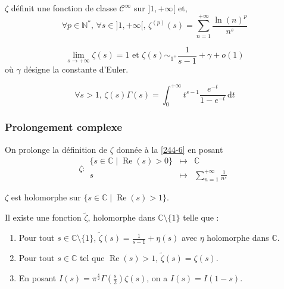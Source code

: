 	\begin{proposition}
		$\zeta$ définit une fonction de classe $\mathcal{C}^\infty$ sur $]1, +\infty[$ et,
		\[ \forall p \in \mathbb{N}^*, \, \forall s \in ]1, +\infty[, \, \zeta^{(p)}(s) = \sum_{n=1}^{+\infty} \frac{\ln(n)^p}{n^s} \]
	\end{proposition}
	
	\begin{proposition}
		\[ \lim_{s \rightarrow +\infty} \zeta(s) = 1 \text{ et } \zeta(s) \sim_{1^+} \frac{1}{s-1} + \gamma + o(1) \]
		où $\gamma$ désigne la constante d'Euler.
	\end{proposition}
	
	
	\begin{proposition}
		\[ \forall s > 1, \, \zeta(s) \Gamma(s) = \int_0^{+\infty} t^{s-1} \frac{e^{-t}}{1 - e^{-t}} \, \mathrm{d}t \]
	\end{proposition}
	
	\subsubsection{Prolongement complexe}
	
	
	\begin{proposition}
		On prolonge la définition de $\zeta$ donnée à la \cref{244-6} en posant
		\[
			\zeta :
			\begin{array}{ccc}
				\{ s \in \mathbb{C} \mid \operatorname{Re}(s) > 0 \} &\mapsto& \mathbb{C} \\
				s &\mapsto& \sum_{n=1}^{+\infty} \frac{1}{n^s}
			\end{array}
		\]
	\end{proposition}
	
	\begin{proposition}
		$\zeta$ est holomorphe sur $\{ s \in \mathbb{C} \mid \operatorname{Re}(s) > 1 \}$.
	\end{proposition}
	
	
	\begin{theorem}
		Il existe une fonction $\widetilde{\zeta}$, holomorphe dans $\mathbb{C} \setminus \{ 1 \}$ telle que :
		\begin{enumerate}[label=(\roman*)]
			\item Pour tout $s \in \mathbb{C} \setminus \{ 1 \}$, $\widetilde{\zeta}(s) = \frac{1}{s-1} + \eta(s)$ avec $\eta$ holomorphe dans $\mathbb{C}$.
			\item Pour tout $s \in \mathbb{C}$ tel que $\operatorname{Re}(s) > 1$, $\widetilde{\zeta}(s) = \zeta(s)$.
			\item En posant $I(s) = \pi^{\frac{s}{2}} \Gamma \left( \frac{s}{2} \right) \zeta(s)$, on a $I(s) = I(1-s)$.
		\end{enumerate}
	\end{theorem}

